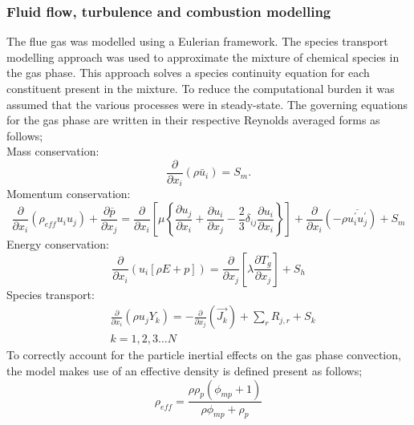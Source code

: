 \documentclass[review]{elsarticle}
\begin{document}
\subsubsection{Fluid flow, turbulence and combustion modelling}
The flue gas was modelled using a Eulerian framework. The species transport modelling approach was used to approximate the mixture of chemical species in the gas phase. This approach solves a species continuity equation for each constituent present in the mixture. To reduce the computational burden it was assumed that the various processes were in steady-state. The governing equations for the gas phase are written in their respective Reynolds averaged forms as follows;\\
Mass conservation:
\begin{equation}\label{eqn_RANS_mass}
\frac{\partial}{\partial x_{i}}(\rho \bar{u}_{i})=S_{m}.
\end{equation}
Momentum conservation:
\begin{equation}\label{eqn_momentum}
\frac{\partial}{\partial x_{i}}(\rho_{eff} u_{i}u_{j})+\frac{\partial \overline{p}}{\partial x_{j}}=\frac{\partial}{\partial x_{i}}\left[\mu\left\{\frac{\partial u_{j}}{\partial x_{i}}+\frac{\partial u_{i}}{\partial x_{j}}-\frac{2}{3}\delta_{ij}\frac{\partial u_{i}}{\partial x_{i}}\right\}\right]+\frac{\partial}{\partial x_{i}}(-\rho\overline{u_{i}^{'}u_{j}^{'}})+S_m
\end{equation}
Energy conservation:
\begin{equation}\label{eqn_energy}
\frac{\partial }{\partial x_{i}} (u_{i}[\rho E+p])=\frac{\partial }{\partial x_{j}}\left[\lambda\frac{\partial T_{g}}{\partial x_{j}}\right] +S_{h}
\end{equation}
Species transport:
\begin{equation}\label{eqn_species}
\begin{split}
&\frac{\partial}{\partial x_{i}}(\rho u_{j}Y_{k})=-\frac{\partial}{\partial x_{j}}(\vec{J_{k}})+ \sum_r R_{j,r} + S_{k}\\
&k = 1,2,3...N
\end{split}
\end{equation}
To correctly account for the particle inertial effects on the gas phase convection, the model makes use of an effective density is defined present as follows;
\begin{equation} \label{eqn_eff_rho}
	\rho_{eff} = \frac{\rho \rho_p \left( \phi_{mp} + 1 \right)}{\rho \phi_{mp} + \rho_p}
\end{equation}
\end{document}
